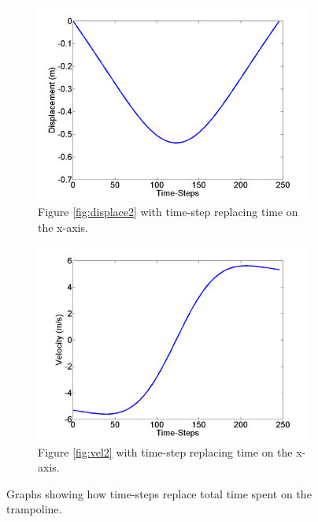 \begin{figure}[H]
	\centering
    \begin{subfigure}{0.45\textwidth}
		\includegraphics[width=\textwidth]{Disp_m1_144m_135fe_timesteps.png}
    	\caption{Figure \ref{fig:displace2} with time-step replacing time on the x-axis.}\label{fig:displace1_ts}
    \end{subfigure}\hfill
	\begin{subfigure}{0.45\textwidth}
		\includegraphics[width=\textwidth]{Vel_m1_144m_135fe_timesteps.png}
    	\caption{Figure \ref{fig:vel2} with time-step replacing time on the x-axis.}\label{fig:vel1_ts}
    \end{subfigure}\hfill
    \caption{Graphs showing how time-steps replace total time spent on the trampoline.}\label{fig:time_step}
\end{figure}

